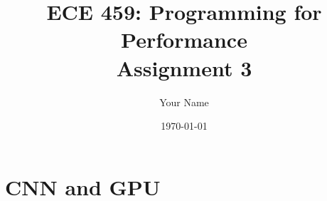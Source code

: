 \documentclass[12pt]{article}
\title{ECE 459: Programming for Performance\\Assignment 3}
\author{Your Name}
\date{\today}
\begin{document}
\maketitle

\section{CNN and GPU}
\end{document}
